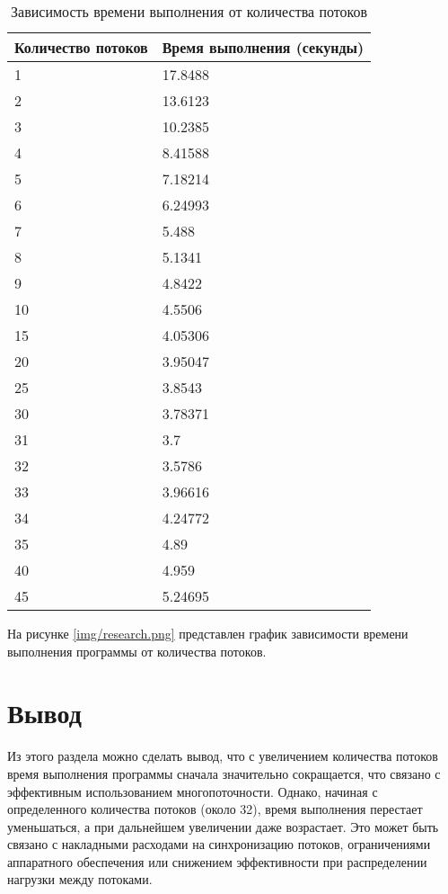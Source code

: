 \begin{table}[h!]
    \small
    \captionsetup{justification=raggedright, singlelinecheck=false, labelsep=endash}
    \caption{Зависимость времени выполнения от количества потоков}
    \label{tbl:execution_time_vs_threads}
    \begin{tabular}{|p{3cm}|p{5cm}|}
        \hline
        Количество потоков & Время выполнения (секунды) \\
        \hline
        1 & 17.8488 \\
        2 & 13.6123 \\
        3 & 10.2385 \\
        4 & 8.41588 \\
        5 & 7.18214 \\
        6 & 6.24993 \\
        7 & 5.488 \\
        8 & 5.1341 \\
        9 & 4.8422 \\
        10 & 4.5506 \\
        15 & 4.05306 \\
        20 & 3.95047 \\
        25 & 3.8543 \\
        30 & 3.78371 \\
        31 & 3.7 \\
        32 & 3.5786 \\
        33 & 3.96616 \\
        34 & 4.24772 \\
        35 & 4.89 \\
        40 & 4.959 \\
        45 & 5.24695 \\
        \hline
    \end{tabular}
\end{table}

На рисунке \ref{img/research.png} представлен график зависимости времени выполнения программы от количества потоков.

\section{Вывод}
Из этого раздела можно сделать вывод, что с увеличением количества потоков время выполнения программы сначала значительно сокращается, что связано с эффективным использованием многопоточности. Однако, начиная с определенного количества потоков (около 32), время выполнения перестает уменьшаться, а при дальнейшем увеличении даже возрастает. Это может быть связано с накладными расходами на синхронизацию потоков, ограничениями аппаратного обеспечения или снижением эффективности при распределении нагрузки между потоками.

